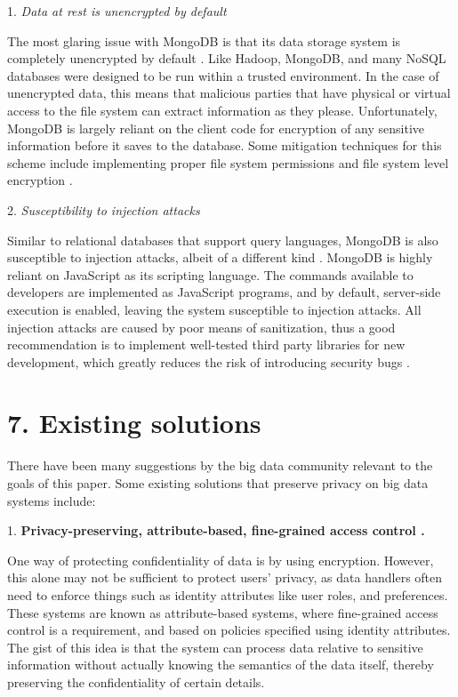 \documentclass{sigchi}
\begin{document}
1. \textit{Data at rest is unencrypted by default} 

The most glaring issue with MongoDB is that its data storage system is completely unencrypted by default \cite{okman2011security}. Like Hadoop, MongoDB, and many NoSQL databases were designed to be run within a trusted environment. In the case of unencrypted data, this means that malicious parties that have physical or virtual access to the file system can extract information as they please. Unfortunately, MongoDB is largely reliant on the client code for encryption of any sensitive information before it saves to the database. Some mitigation techniques for this scheme include implementing proper file system permissions and file system level encryption \cite{okman2011security}.

2. \textit{Susceptibility to injection attacks}

Similar to relational databases that support query languages, MongoDB is also susceptible to injection attacks, albeit of a different kind \cite{sullivan2011server}. MongoDB is highly reliant on JavaScript as its scripting language. The commands available to developers are implemented as JavaScript programs, and by default, server-side execution is enabled, leaving the system susceptible to injection attacks. All injection attacks are caused by poor means of sanitization, thus a good recommendation is to implement well-tested third party libraries for new development, which greatly reduces the risk of introducing security bugs \cite{ron2016analysis}.

\section{7. Existing solutions}

There have been many suggestions by the big data community relevant to the goals of this paper. Some existing solutions that preserve privacy on big data systems include:

1. \textbf{Privacy-preserving, attribute-based, fine-grained access control \cite{nabeel2013privacy}.}

One way of protecting confidentiality of data is by using encryption. However, this alone may not be sufficient to protect users' privacy, as data handlers often need to enforce things such as identity attributes like user roles, and preferences. These systems are known as attribute-based systems, where fine-grained access control is a requirement, and based on policies specified using identity attributes. The gist of this idea is that the system can process data relative to sensitive information without actually knowing the semantics of the data itself, thereby preserving the confidentiality of certain details.
\end{document}
